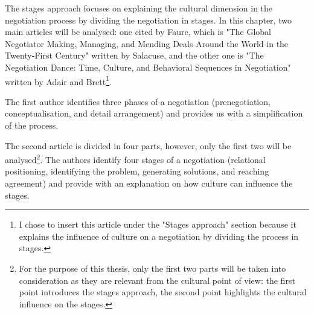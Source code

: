 \documentclass[../main.tex]{subfiles}
\begin{document}
The stages approach focuses on explaining the cultural dimension in the negotiation process by dividing the negotiation in stages. In this chapter, two main articles will be analysed: one cited by Faure, which is "The Global Negotiator Making, Managing, and Mending Deals Around the World in the Twenty-First Century" written by Salacuse, and the other one is "The Negotiation Dance: Time, Culture, and Behavioral Sequences in Negotiation" written by Adair and Brett\footnote{I chose to insert this article under the "Stages approach" section because it explains the influence of culture on a negotiation by dividing the process in stages.}. 

The first author identifies three phases of a negotiation (prenegotiation, conceptualisation, and detail arrangement) and provides us with a simplification of the process.

The second article is divided in four parts, however, only the first two will be analysed\footnote{For the purpose of this thesis, only the first two parts will be taken into consideration as they are relevant from the cultural point of view: the first point introduces the stages approach, the second point highlights the cultural influence on the stages.}. The authors identify four stages of a negotiation (relational positioning, identifying the problem, generating solutions, and reaching agreement) and provide with an explanation on how culture can influence the stages.\\
\end{document}
